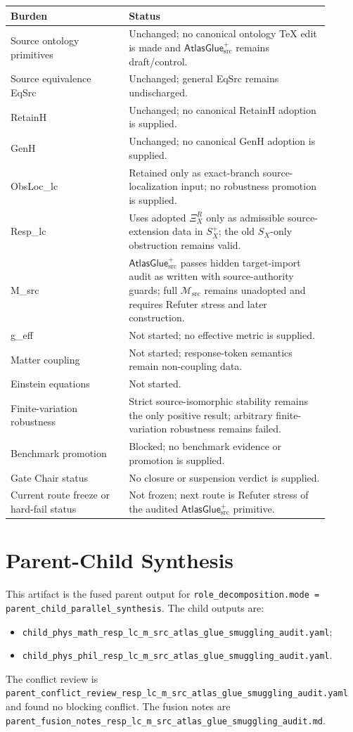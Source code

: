 \documentclass[11pt]{article}
\newcommand{\Msrc}{\mathcal{M}_{\mathrm{src}}}
\newcommand{\XiR}{\Xi_X^R}
\newcommand{\SX}{S_X}
\newcommand{\Splus}{S_X^+}
\newcommand{\AtlasGlue}{\mathsf{AtlasGlue}_{\mathrm{src}}^{+}}
\begin{document}
\begin{center}
\begin{tabular}{p{0.33\linewidth}p{0.57\linewidth}}
\hline
Burden & Status \\
\hline
Source ontology primitives & Unchanged; no canonical ontology TeX edit is made and \(\AtlasGlue\) remains draft/control. \\
Source equivalence EqSrc & Unchanged; general EqSrc remains undischarged. \\
RetainH & Unchanged; no canonical RetainH adoption is supplied. \\
GenH & Unchanged; no canonical GenH adoption is supplied. \\
ObsLoc\_lc & Retained only as exact-branch source-localization input; no robustness promotion is supplied. \\
Resp\_lc & Uses adopted \(\XiR\) only as admissible source-extension data in \(\Splus\); the old \(\SX\)-only obstruction remains valid. \\
M\_src & \(\AtlasGlue\) passes hidden target-import audit as written with source-authority guards; full \(\Msrc\) remains unadopted and requires Refuter stress and later construction. \\
g\_eff & Not started; no effective metric is supplied. \\
Matter coupling & Not started; response-token semantics remain non-coupling data. \\
Einstein equations & Not started. \\
Finite-variation robustness & Strict source-isomorphic stability remains the only positive result; arbitrary finite-variation robustness remains failed. \\
Benchmark promotion & Blocked; no benchmark evidence or promotion is supplied. \\
Gate Chair status & No closure or suspension verdict is supplied. \\
Current route freeze or hard-fail status & Not frozen; next route is Refuter stress of the audited \(\AtlasGlue\) primitive. \\
\hline
\end{tabular}
\end{center}

\section{Parent-Child Synthesis}

This artifact is the fused parent output for
\texttt{role\_decomposition.mode = parent\_child\_parallel\_synthesis}. The
child outputs are:
\begin{itemize}
  \item \texttt{child\_phys\_math\_resp\_lc\_m\_src\_atlas\_glue\_smuggling\_audit.yaml};
  \item \texttt{child\_phys\_phil\_resp\_lc\_m\_src\_atlas\_glue\_smuggling\_audit.yaml}.
\end{itemize}
The conflict review is
\texttt{parent\_conflict\_review\_resp\_lc\_m\_src\_atlas\_glue\_smuggling\_audit.yaml}
and found no blocking conflict. The fusion notes are
\texttt{parent\_fusion\_notes\_resp\_lc\_m\_src\_atlas\_glue\_smuggling\_audit.md}.
\end{document}
